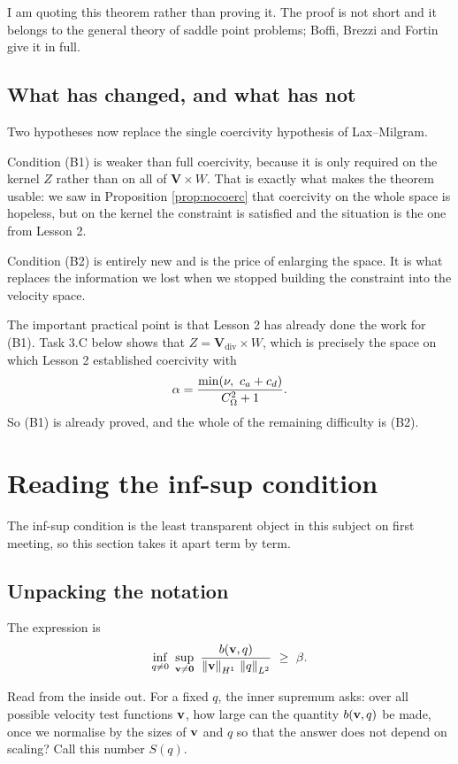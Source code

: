 \documentclass[11pt,a4paper]{article}
\newcommand{\Vdiv}{\mathbf{V}_{\mathrm{div}}}
\newcommand{\Vsp}{\mathbf{V}}
\newcommand{\Wsp}{W}
\newcommand{\Zsp}{Z}
\newcommand{\bzero}{\mathbf{0}}
\begin{document}
I am quoting this theorem rather than proving it. The proof is not
short and it belongs to the general theory of saddle point problems; Boffi,
Brezzi and Fortin give it in full.

\subsection{What has changed, and what has not}

Two hypotheses now replace the single coercivity hypothesis of Lax--Milgram.

Condition (B1) is weaker than full coercivity, because it is only required on
the kernel $\Zsp$ rather than on all of $\Vsp \times \Wsp$. That is exactly what
makes the theorem usable: we saw in Proposition \ref{prop:nocoerc} that
coercivity on the whole space is hopeless, but on the kernel the constraint is
satisfied and the situation is the one from Lesson 2.

Condition (B2) is entirely new and is the price of enlarging the space. It is
what replaces the information we lost when we stopped building the constraint
into the velocity space.

The important practical point is that Lesson 2 has already done the work for
(B1). Task 3.C below shows that $\Zsp = \Vdiv \times \Wsp$, which is precisely
the space on which Lesson 2 established coercivity with
\[
  \alpha = \frac{\min(\nu,\ c_{a}+c_{d})}{C_\Om^{2}+1} .
\]
So (B1) is already proved, and the whole of the remaining difficulty is (B2).

\section{Reading the inf-sup condition}

The inf-sup condition is the least transparent object in this subject on first
meeting, so this section takes it apart term by term.

\subsection{Unpacking the notation}

The expression is
\[
  \inf_{q \neq 0} \ \sup_{\bv \neq \bzero} \
  \frac{b(\bv,q)}{\normH{\bv}\,\normL{q}} \ \ge\ \beta .
\]

Read from the inside out. For a fixed $q$, the inner supremum asks: over all
possible velocity test functions $\mathbf{v}$, how large can the quantity
$b(\mathbf{v},q)$ be made, once we normalise by the sizes of $\mathbf{v}$ and $q$ so that the
answer does not depend on scaling? Call this number $S(q)$.
\end{document}
